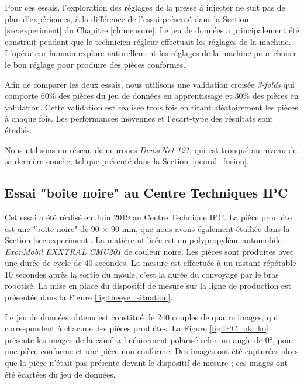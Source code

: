 Pour ces essais, l'exploration des réglages de la presse à injecter ne suit pas de plan d'expériences, à la différence de l'essai présenté dans la Section \ref{sec:experiment} du Chapitre \ref{ch:measure}.
Le jeu de données a principalement été construit pendant que le technicien-régleur effectuait les réglages de la machine.
L’opérateur humain explore naturellement les réglages de la machine pour choisir le bon réglage pour produire des pièces conformes.

Afin de comparer les deux essais, nous utilisons une validation croisée \textit{3-folds} qui comporte 60\% des pièces du jeu de données en apprentissage et 30\% des pièces en validation.
Cette validation est réalisée trois fois en tirant aléatoirement les pièces à chaque fois.
Les performances moyennes et l'écart-type des résultats sont étudiés.

Nous utilisons un réseau de neurones \textit{DenseNet 121}, qui est tronqué au niveau de sa dernière couche, tel que présenté dans la Section \ref{neural_fusion}.

\subsection{Essai "boîte noire" au Centre Techniques IPC} \label{subsec:box_trial}
Cet essai a été réalisé en Juin 2019 au Centre Technique IPC.
La pièce produite est une "boîte noire" de 90 $\times$ 90 mm, que nous avons également étudiée dans la Section \ref{sec:experiment}.
La matière utilisée est un polypropylène automobile \textit{ExonMobil EXXTRAL CMU201} de couleur noire.
Les pièces sont produites avec une durée de cycle de 40 secondes.
La mesure est effectuée à un instant répétable 10 secondes après la sortie du moule, c'est la durée du convoyage par le bras robotisé.
La mise en place du dispositif de mesure sur la ligne de production est présentée dans la Figure \ref{fig:theeye_situation}.

Le jeu de données obtenu est constitué de 240 couples de quatre images, qui correspondent à chacune des pièces produites.
La Figure \ref{fig:IPC_ok_ko} présente les images de la caméra linéairement polarisé selon un angle de 0°, pour une pièce conforme et une pièce non-conforme.
Des images ont été capturées alors que la pièce n'était pas présente devant le dispositif de mesure ; ces images ont été écartées du jeu de données.

